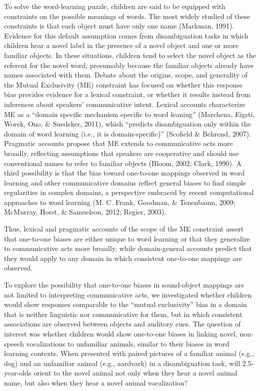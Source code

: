 \documentclass[english,floatsintext,man]{apa6}
\theoremstyle{definition}
\theoremstyle{definition}
\theoremstyle{definition}
\theoremstyle{remark}
\begin{document}
To solve the word-learning puzzle, children are said to be equipped with
constraints on the possible meanings of words. The most widely studied
of these constraints is that each object must have only one name
(Markman, 1991). Evidence for this default assumption comes from
disambiguation tasks in which children hear a novel label in the
presence of a novel object and one or more familiar objects. In these
situations, children tend to select the novel object as the referent for
the novel word, presumably because the familiar objects already have
names associated with them. Debate about the origins, scope, and
generality of the Mutual Exclusivity (ME) constraint has focused on
whether this response bias provides evidence for a lexical constraint,
or whether it results instead from inferences about speakers'
communicative intent. Lexical accounts characterize ME as a
\enquote{domain specific mechanism specific to word leaning} (Marchena,
Eigsti, Worek, Ono, \& Snedeker, 2011), which \enquote{predicts
disambiguation only within the domain of word learning (i.e., it is
domain-specific)} (Scofield \& Behrend, 2007). Pragmatic accounts
propose that ME extends to communicative acts more broadly, reflecting
assumptions that speakers are cooperative and should use conventional
names to refer to familiar objects (Bloom, 2002; Clark, 1990). A third
possibility is that the bias toward one-to-one mappings observed in word
learning and other communicative domains reflect general biases to find
simple regularities in complex domains, a perspective embraced by recent
computational approaches to word learning (M. C. Frank, Goodman, \&
Tenenbaum, 2009; McMurray, Horst, \& Samuelson, 2012; Regier, 2003).

Thus, lexical and pragmatic accounts of the scope of the ME constraint
assert that one-to-one biases are either unique to word learning or that
they generalize to communicative acts more broadly, while domain-general
accounts predict that they would apply to any domain in which consistent
one-to-one mappings are observed.

To explore the possibility that one-to-one biases in sound-object
mappings are not limited to interpreting communicative acts, we
investigated whether children would show responses comparable to the
\enquote{mutual exclusivity} bias in a domain that is neither linguistic
nor communicative for them, but in which consistent associations are
observed between objects and auditory cues. The question of interest was
whether children would show one-to-one biases in linking novel,
non-speech vocalizations to unfamiliar animals, similar to their biases
in word learning contexts. When presented with paired pictures of a
familiar animal (e.g., dog) and an unfamiliar animal (e.g., aardvark) in
a disambiguation task, will 2.5-year-olds orient to the novel animal not
only when they hear a novel animal name, but also when they hear a novel
animal vocalization?
\end{document}

